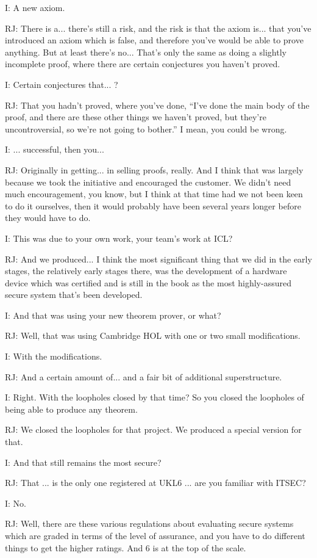 \documentclass[10pt,titlepage]{book}
\begin{document}
I: A new axiom.

RJ: There is a... there's still a risk, and the risk is that the axiom is... that you've introduced an axiom which is false, and therefore you've would be able to prove anything.
But at least there's no...
That's only the same as doing a slightly incomplete proof, where there are certain conjectures you haven't proved.

I: Certain conjectures that... ?

RJ: That you hadn't proved, where you've done, ``I've done the main body of the proof, and there are these other things we haven't proved, but they're uncontroversial, so we're not going to bother.''
I mean, you could be wrong.

I: ... successful, then you...

RJ: Originally in getting... in selling proofs, really.
And I think that was largely because we took the initiative and encouraged the customer.
We didn't need much encouragement, you know, but I think at that time had we not been keen to do it ourselves, then it would probably have been several years longer before they would have	to do.

I: This was due to your own work, your team's work at ICL?

RJ: And we produced... I think the most significant thing that we did in the early stages, the relatively early stages there, was the development of a hardware device which was certified and is still in the book as the most highly-assured secure system that's been developed.

I: And that was using your new theorem prover, or what?

RJ: Well, that was using Cambridge HOL with one or two small modifications.

I: With the modifications.

RJ: And a certain amount of... and a fair bit of additional superstructure.

I: Right.
With the loopholes closed by that time?
So you closed the loopholes of being able to produce any theorem.

RJ: We closed the loopholes for that project.
We produced a special version for that.

I: And that still remains the most secure?

RJ: That ... is the only one registered at UKL6 ...
 are you familiar with ITSEC?

I: No.

RJ: Well, there are these various regulations about evaluating secure systems which are graded in terms of the level of assurance, and you have to do different things to get the higher ratings.
And 6 is at the top of the scale.
\end{document}
